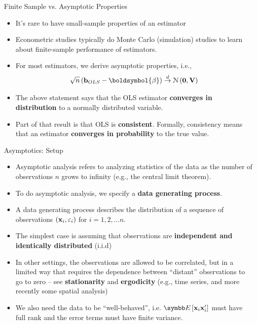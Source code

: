 \documentclass[aspectratio=169,11pt]{beamer}
\begin{document}
\begin{frame}{Finite Sample vs. Asymptotic Properties}
\begin{itemize}
	\item It's rare to have small-sample properties of an estimator

	\medskip
	\item Econometric studies typically do Monte Carlo (simulation) studies to learn
	about finite-sample performance of estimators. 

	\medskip
	\item For most estimators, we derive asymptotic properties, i.e., \[
	\sqrt{n} \left({\bf b}_{OLS} - \boldsymbol{\beta}\right) \overset{d}{\to} \mathcal{N}\left({\bf 0}, {\bf V}\right)
	\]

	\item The above statement says that the OLS estimator
	 {\bf converges in distribution} to a normally distributed variable.

	\item Part of that result is that OLS is {\bf consistent}. Formally, consistency means that an estimator
	{\bf converges in probability} to the true value. 
\end{itemize}
\end{frame}



\begin{frame}{Asymptotics: Setup}
\begin{itemize}

	\item Asymptotic analysis refers to analyzing statistics of the data as the number of observations $n$
	grows to infinity (e.g., the central limit theorem).

	\item To do asymptotic analysis, we specify a {\bf data generating process}. 
	
	\item A data generating process describes the distribution of 
	 a sequence of observations $\left({\bf x}_{i},\varepsilon_{i}\right)$ 	for $i=1,2,\dots n$. 


	\item The simplest case is assuming that observations are {\bf independent and identically distributed}
	(i.i.d)

	\item In other settings, the observations are allowed to be correlated, but in a limited way 
	that requires the dependence between ``distant'' observations to go to zero -- see {\bf stationarity}
	and {\bf ergodicity} (e.g., time series, and 	more recently some spatial analysis)

	\item We also need the data to be ``well-behaved'', i.e. $\E\left[{\bf x}_{i} {\bf x}_{i}' \right]$ must have
	full rank and the error terms must have finite variance. 

\end{itemize}
\end{frame}
\end{document}

